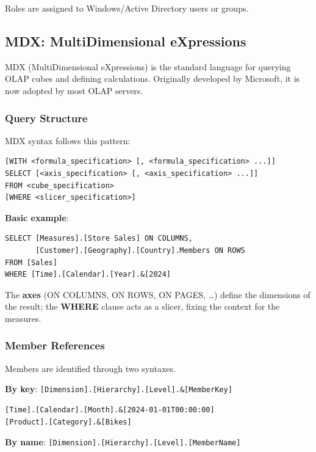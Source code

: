 Roles are assigned to Windows/Active Directory users or groups.

\subsection{MDX: MultiDimensional eXpressions}
\label{sec:mdx}

MDX (MultiDimensional eXpressions) is the standard language for querying OLAP cubes and defining calculations. Originally developed by Microsoft, it is now adopted by most OLAP servers.

\subsubsection{Query Structure}
\label{subsec:mdx-query-structure}

MDX syntax follows this pattern:

\begin{lstlisting}
[WITH <formula_specification> [, <formula_specification> ...]]
SELECT [<axis_specification> [, <axis_specification> ...]]
FROM <cube_specification>
[WHERE <slicer_specification>]
\end{lstlisting}

\textbf{Basic example}:
\begin{lstlisting}
SELECT [Measures].[Store Sales] ON COLUMNS,
       [Customer].[Geography].[Country].Members ON ROWS
FROM [Sales]
WHERE [Time].[Calendar].[Year].&[2024]
\end{lstlisting}

The \textbf{axes} (ON COLUMNS, ON ROWS, ON PAGES, \dots) define the dimensions of the result; the \textbf{WHERE} clause acts as a slicer, fixing the context for the measures.

\subsubsection{Member References}
\label{subsec:mdx-member-references}

Members are identified through two syntaxes.

\textbf{By key}: \texttt{[Dimension].[Hierarchy].[Level].\&[MemberKey]}

\begin{lstlisting}
[Time].[Calendar].[Month].&[2024-01-01T00:00:00]
[Product].[Category].&[Bikes]
\end{lstlisting}

\textbf{By name}: \texttt{[Dimension].[Hierarchy].[Level].[MemberName]}

